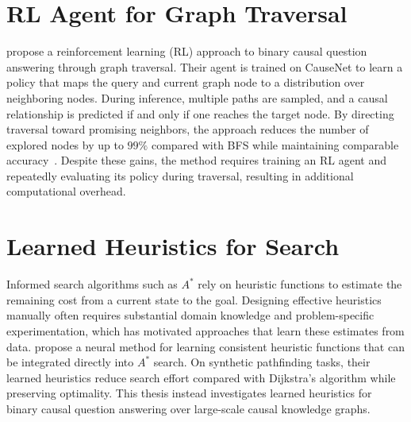 \section{RL Agent for Graph Traversal}
\label{sec:rw_rl}

\citet{bluebaum:2024} propose a reinforcement learning (RL) approach to binary causal question answering through graph traversal. Their agent is trained on CauseNet to learn a policy that maps the query and current graph node to a distribution over neighboring nodes. During inference, multiple paths are sampled, and a causal relationship is predicted if and only if one reaches the target node. By directing traversal toward promising neighbors, the approach reduces the number of explored nodes by up to $99\%$ compared with BFS while maintaining comparable accuracy~\cite{bluebaum:2024}. Despite these gains, the method requires training an RL agent and repeatedly evaluating its policy during traversal, resulting in additional computational overhead.

\section{Learned Heuristics for Search}
\label{sec:rw_learned_heuristics}

Informed search algorithms such as $A^*$ rely on heuristic functions to estimate
the remaining cost from a current state to the goal. Designing effective
heuristics manually often requires substantial domain knowledge and
problem-specific experimentation, which has motivated approaches that learn
these estimates from data. \citet{numeroso:2022} propose a
neural method for learning consistent heuristic functions that can be integrated directly into $A^*$ search. On synthetic pathfinding tasks, their learned heuristics reduce search effort compared with Dijkstra's algorithm while preserving optimality. This thesis instead investigates learned heuristics for binary causal question answering over large-scale causal knowledge graphs.
